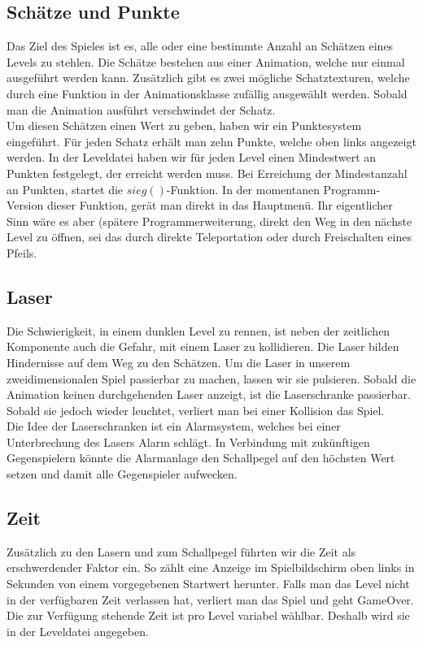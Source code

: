 \documentclass[11pt,a4paper]{scrbook}
\begin{document}
\subsection{Schätze und Punkte}
\label{Schaetze}
Das Ziel des Spieles ist es, alle oder eine bestimmte Anzahl an Schätzen eines Levels zu stehlen.
Die Schätze bestehen aus einer Animation, welche nur einmal ausgeführt werden kann.
Zusätzlich gibt es zwei mögliche Schatztexturen, welche durch eine Funktion in der Animationsklasse zufällig ausgewählt werden.
Sobald man die Animation ausführt verschwindet der Schatz.
\\
Um diesen Schätzen einen Wert zu geben, haben wir ein Punktesystem eingeführt.
Für jeden Schatz erhält man zehn Punkte, welche oben links angezeigt werden.
In der Leveldatei haben wir für jeden Level einen Mindestwert an Punkten festgelegt, der erreicht werden muss.
Bei Erreichung der Mindestanzahl an Punkten, startet die $sieg()$-Funktion.
In der momentanen Programm-Version dieser Funktion, gerät man direkt in das Hauptmenü.
Ihr eigentlicher Sinn wäre es aber (spätere Programmerweiterung, direkt den Weg in den nächste Level zu öffnen, sei das durch direkte Teleportation oder durch Freischalten eines Pfeils.    

\subsection{Laser}
Die Schwierigkeit, in einem dunklen Level zu rennen, ist neben der zeitlichen Komponente auch die Gefahr, mit einem Laser zu kollidieren.
Die Laser bilden Hindernisse auf dem Weg zu den Schätzen.
Um die Laser in unserem zweidimensionalen Spiel passierbar zu machen, lassen wir sie pulsieren.
Sobald die Animation keinen durchgehenden Laser anzeigt, ist die Laserschranke passierbar.
Sobald sie jedoch wieder leuchtet, verliert man bei einer Kollision das Spiel.
\\
Die Idee der Laserschranken ist ein Alarmsystem, welches bei einer Unterbrechung des Lasers Alarm schlägt. In Verbindung mit zukünftigen Gegenspielern könnte die Alarmanlage den Schallpegel auf den höchsten Wert setzen und damit alle Gegenspieler aufwecken.

\subsection{Zeit}
\label{Zeitlimit}
Zusätzlich zu den Lasern und zum Schallpegel führten wir die Zeit als erschwerdender Faktor ein. 
So zählt eine Anzeige im Spielbildschirm oben links in Sekunden von einem vorgegebenen Startwert herunter. Falls man das Level nicht in der verfügbaren Zeit verlassen hat, verliert man das Spiel und geht GameOver. Die zur Verfügung stehende Zeit ist pro Level variabel wählbar. Deshalb wird sie in der Leveldatei angegeben.
    
\end{document}
